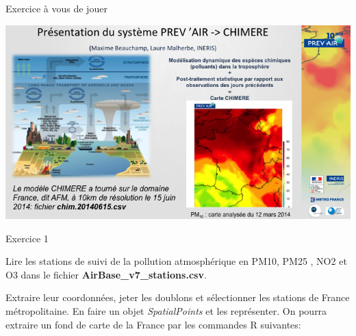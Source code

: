 \documentclass[8pt,ignorenonframetext,]{beamer}
\newenvironment{Shaded}{\begin{snugshade}}{\end{snugshade}}
\newcommand{\KeywordTok}[1]{\textcolor[rgb]{0.13,0.29,0.53}{\textbf{{#1}}}}
\newcommand{\DecValTok}[1]{\textcolor[rgb]{0.00,0.00,0.81}{{#1}}}
\newcommand{\StringTok}[1]{\textcolor[rgb]{0.31,0.60,0.02}{{#1}}}
\newcommand{\CommentTok}[1]{\textcolor[rgb]{0.56,0.35,0.01}{\textit{{#1}}}}
\newcommand{\NormalTok}[1]{{#1}}
\begin{document}
\begin{frame}{Exercice à vous de jouer}

\begin{center}
  \includegraphics[width=1\textwidth]{figINERIS2.png}
\end{center}

\end{frame}

\begin{frame}[fragile]{Exercice 1}

Lire les stations de suivi de la pollution atmosphérique en PM10, PM25 ,
NO2 et O3 dans le fichier \textbf{AirBase\_v7\_stations.csv}.

Extraire leur coordonnées, jeter les doublons et sélectionner les
stations de France métropolitaine. En faire un objet
\emph{SpatialPoints} et les représenter. On pourra extraire un fond de
carte de la France par les commandes R suivantes:

\begin{Shaded}
\end{Shaded}

\end{frame}
\end{document}
